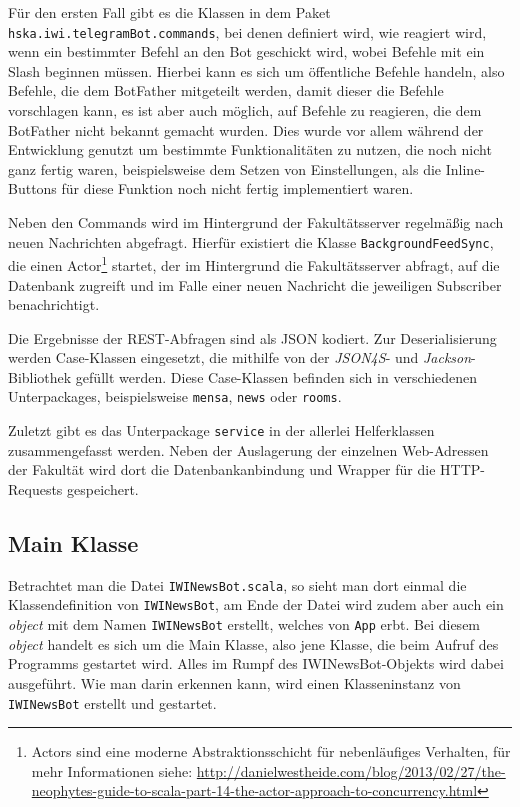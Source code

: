 Für den ersten Fall gibt es die Klassen in dem Paket \texttt{hska\allowbreak.iwi\allowbreak.telegramBot\allowbreak.commands}, bei denen definiert wird, wie reagiert wird, wenn ein bestimmter Befehl an den Bot geschickt wird, wobei Befehle mit ein Slash beginnen müssen. Hierbei kann es sich um öffentliche Befehle handeln, also Befehle, die dem BotFather mitgeteilt werden, damit dieser die Befehle vorschlagen kann, es ist aber auch möglich, auf Befehle zu reagieren, die dem BotFather nicht bekannt gemacht wurden. Dies wurde vor allem während der Entwicklung genutzt um bestimmte Funktionalitäten zu nutzen, die noch nicht ganz fertig waren, beispielsweise dem Setzen von Einstellungen, als die Inline-Buttons für diese Funktion noch nicht fertig implementiert waren.

Neben den Commands wird im Hintergrund der Fakultätsserver regelmäßig nach neuen Nachrichten abgefragt. Hierfür existiert die Klasse \texttt{BackgroundFeedSync}, die einen Actor\footnote{Actors sind eine moderne Abstraktionsschicht für nebenläufiges Verhalten, für mehr Informationen siehe: \url{http://danielwestheide.com/blog/2013/02/27/the-neophytes-guide-to-scala-part-14-the-actor-approach-to-concurrency.html}} startet, der im Hintergrund die Fakultätsserver abfragt, auf die Datenbank zugreift und im Falle einer neuen Nachricht die jeweiligen Subscriber benachrichtigt.

Die Ergebnisse der REST-Abfragen sind als JSON kodiert. Zur Deserialisierung werden Case-Klassen eingesetzt, die mithilfe von der \emph{JSON4S}- und \emph{Jackson}-Bibliothek gefüllt werden. Diese Case-Klassen befinden sich in verschiedenen Unterpackages, beispielsweise \texttt{mensa}, \texttt{news} oder \texttt{rooms}.

Zuletzt gibt es das Unterpackage \texttt{service} in der allerlei Helferklassen zusammengefasst werden. Neben der Auslagerung der einzelnen Web-Adressen der Fakultät wird dort die Datenbankanbindung und Wrapper für die HTTP-Requests gespeichert.

\subsection{Main Klasse}\label{sec:Programmstart}
Betrachtet man die Datei \texttt{IWINewsBot.scala}, so sieht man dort einmal die Klassendefinition von \texttt{IWINewsBot}, am Ende der Datei wird zudem aber auch ein \emph{object} mit dem Namen \texttt{IWINewsBot} erstellt, welches von \texttt{App} erbt. Bei diesem \emph{object} handelt es sich um die Main Klasse, also jene Klasse, die beim Aufruf des Programms gestartet wird. Alles im Rumpf des IWINewsBot-Objekts wird dabei ausgeführt. Wie man darin erkennen kann, wird einen Klasseninstanz von \texttt{IWINewsBot} erstellt und gestartet.

